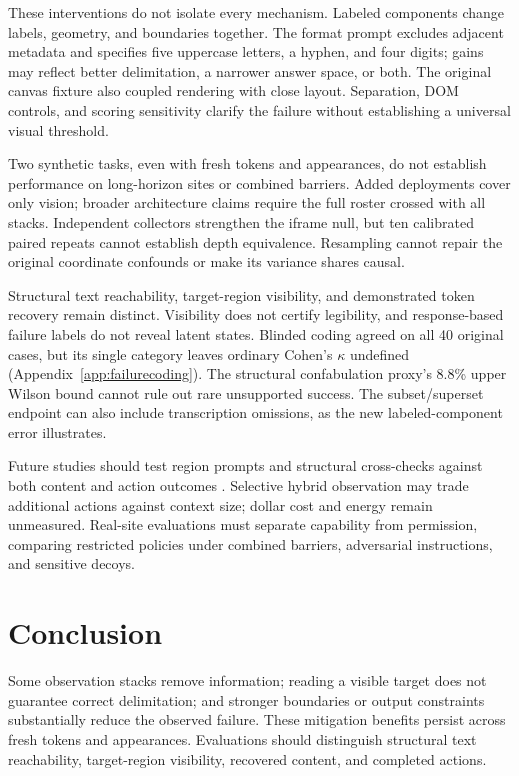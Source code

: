 \documentclass{article}
\begin{document}
These interventions do not isolate every mechanism. Labeled components change labels, geometry, and boundaries together. The format prompt excludes adjacent metadata and specifies five uppercase letters, a hyphen, and four digits; gains may reflect better delimitation, a narrower answer space, or both. The original canvas fixture also coupled rendering with close layout. Separation, DOM controls, and scoring sensitivity clarify the failure without establishing a universal visual threshold.

Two synthetic tasks, even with fresh tokens and appearances, do not establish performance on long-horizon sites or combined barriers. Added deployments cover only vision; broader architecture claims require the full roster crossed with all stacks. Independent collectors strengthen the iframe null, but ten calibrated paired repeats cannot establish depth equivalence. Resampling cannot repair the original coordinate confounds or make its variance shares causal.

Structural text reachability, target-region visibility, and demonstrated token recovery remain distinct. Visibility does not certify legibility, and response-based failure labels do not reveal latent states. Blinded coding agreed on all 40 original cases, but its single category leaves ordinary Cohen's $\kappa$ undefined (Appendix~\ref{app:failurecoding}). The structural confabulation proxy's 8.8\% upper Wilson bound cannot rule out rare unsupported success. The subset/superset endpoint can also include transcription omissions, as the new labeled-component error illustrates.

Future studies should test region prompts and structural cross-checks against both content and action outcomes \citep{yang2023setofmark,zheng2024seeact}. Selective hybrid observation may trade additional actions against context size; dollar cost and energy remain unmeasured. Real-site evaluations must separate capability from permission, comparing restricted policies under combined barriers, adversarial instructions, and sensitive decoys.

\section{Conclusion}
Some observation stacks remove information; reading a visible target does not guarantee correct delimitation; and stronger boundaries or output constraints substantially reduce the observed failure. These mitigation benefits persist across fresh tokens and appearances. Evaluations should distinguish structural text reachability, target-region visibility, recovered content, and completed actions.
\end{document}
